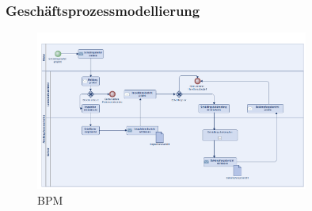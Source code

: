 \begin{frame}
\frametitle{Geschäftsprozessmodellierung}

\begin{figure}
  \includegraphics[width=0.8\textwidth]{figures/BPM.png}
  \caption{BPM}
  \label{fig:BPM}
\end{figure}

\end{frame}





